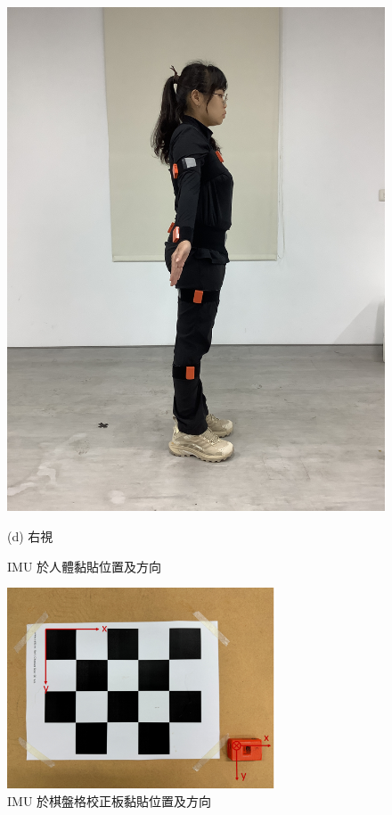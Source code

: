 \begin{figure}[!ht]
\begin{minipage}{.25\textwidth}
     \includegraphics[width=\linewidth, angle=-90]{figure/ch3_fig_rightimu.JPG}
     \caption*{(d) 右視}
   \end{minipage}
   \caption[IMU 於人體黏貼位置及方向]{IMU 於人體黏貼位置及方向}
   \label{ch3_fig_humanimu}
\end{figure}

\begin{figure}[!ht]
   \centering
   \includegraphics[width=8cm]{figure/ch3_fig_imgimu.png}
    \caption[IMU 於棋盤格校正板黏貼位置及方向]{IMU 於棋盤格校正板黏貼位置及方向}
    \label{ch3_fig_imgimu}
\end{figure}


